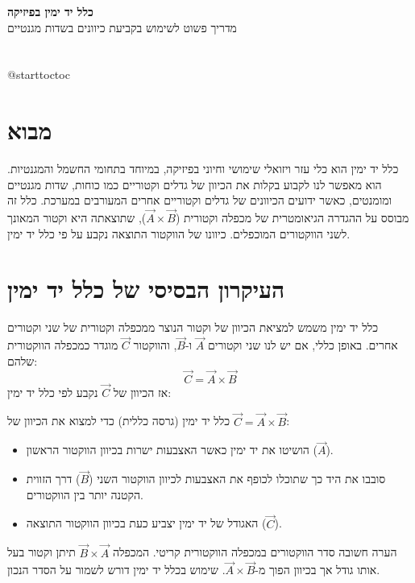 \documentclass[12pt]{article}
\makeatletter
\renewcommand\tableofcontents{\section*{ \contentsname}
    @starttoc{toc}}
\makeatother
\begin{document}
\begin{center}
    \Huge\textbf{כלל יד ימין בפיזיקה} \\
    \Large מדריך פשוט לשימוש בקביעת כיוונים בשדות מגנטיים
\end{center}

\vspace{1cm}

\tableofcontents

\newpage %

\section{מבוא}
כלל יד ימין הוא כלי עזר ויזואלי שימושי וחיוני בפיזיקה, במיוחד בתחומי החשמל והמגנטיות. הוא מאפשר לנו לקבוע בקלות את הכיוון של גדלים וקטוריים כמו כוחות, שדות מגנטיים ומומנטים, כאשר ידועים הכיוונים של גדלים וקטוריים אחרים המעורבים במערכת. כלל זה מבוסס על ההגדרה הגיאומטרית של מכפלה וקטורית (\( \vec{A} \times \vec{B} \)), שתוצאתה היא וקטור המאונך לשני הווקטורים המוכפלים. כיוונו של הווקטור התוצאה נקבע על פי כלל יד ימין.

\section{העיקרון הבסיסי של כלל יד ימין}
כלל יד ימין משמש למציאת הכיוון של וקטור הנוצר ממכפלה וקטורית של שני וקטורים אחרים. באופן כללי, אם יש לנו שני וקטורים \( \vec{A} \) ו-\( \vec{B} \), והווקטור \( \vec{C} \) מוגדר כמכפלה הווקטורית שלהם:
\[ \vec{C} = \vec{A} \times \vec{B} \]
אז הכיוון של \( \vec{C} \) נקבע לפי כלל יד ימין:

\begin{definitionBox}{כלל יד ימין (גרסה כללית)}
כדי למצוא את הכיוון של \( \vec{C} = \vec{A} \times \vec{B} \):
\begin{itemize}
    \item הושיטו את יד ימין כאשר האצבעות ישרות בכיוון הווקטור הראשון (\( \vec{A} \)).
    \item סובבו את היד כך שתוכלו לכופף את האצבעות לכיוון הווקטור השני (\( \vec{B} \)) דרך הזווית הקטנה יותר בין הווקטורים.
    \item האגודל של יד ימין יצביע כעת בכיוון הווקטור התוצאה (\( \vec{C} \)).
\end{itemize}
\end{definitionBox}

\begin{remarkBox}{הערה חשובה}
סדר הווקטורים במכפלה הווקטורית קריטי. המכפלה \( \vec{B} \times \vec{A} \) תיתן וקטור בעל אותו גודל אך בכיוון הפוך מ-\( \vec{A} \times \vec{B} \). שימוש בכלל יד ימין דורש לשמור על הסדר הנכון.
\end{remarkBox}
\end{document}

